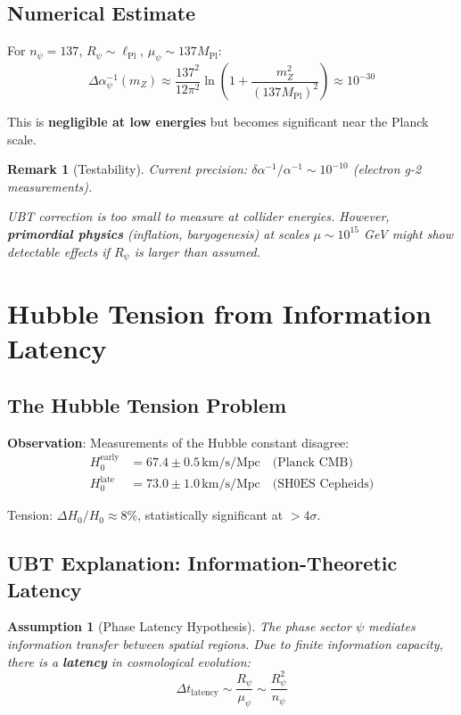 \documentclass[12pt]{article}
\newtheorem{remark}[definition]{Remark}
\newtheorem{assumption}{Assumption}[section]
\begin{document}
\subsection{Numerical Estimate}

For $n_\psi = 137$, $R_\psi \sim \ell_{\text{Pl}}$, $\mu_\psi \sim 137 M_{\text{Pl}}$:
\begin{equation}
\Delta \alpha^{-1}_{\psi}(m_Z) \approx \frac{137^2}{12\pi^2} \ln\left(1 + \frac{m_Z^2}{(137 M_{\text{Pl}})^2}\right) \approx 10^{-30}
\end{equation}

This is \textbf{negligible at low energies} but becomes significant near the Planck scale.

\begin{remark}[Testability]
Current precision: $\delta \alpha^{-1} / \alpha^{-1} \sim 10^{-10}$ (electron g-2 measurements).

UBT correction is too small to measure at collider energies. However, \textbf{primordial physics} (inflation, baryogenesis) at scales $\mu \sim 10^{15}$ GeV might show detectable effects if $R_\psi$ is larger than assumed.
\end{remark}

\section{Hubble Tension from Information Latency}
\label{sec:hubble_tension}

\subsection{The Hubble Tension Problem}

\textbf{Observation}: Measurements of the Hubble constant disagree:
\begin{align}
H_0^{\text{early}} &= 67.4 \pm 0.5 \, \text{km/s/Mpc} \quad \text{(Planck CMB)} \\
H_0^{\text{late}} &= 73.0 \pm 1.0 \, \text{km/s/Mpc} \quad \text{(SH0ES Cepheids)}
\end{align}

Tension: $\Delta H_0 / H_0 \approx 8\%$, statistically significant at $>4\sigma$.

\subsection{UBT Explanation: Information-Theoretic Latency}

\begin{assumption}[Phase Latency Hypothesis]
\label{ass:latency}
The phase sector $\psi$ mediates information transfer between spatial regions. Due to finite information capacity, there is a \textbf{latency} in cosmological evolution:
\begin{equation}
\Delta t_{\text{latency}} \sim \frac{R_\psi}{\mu_\psi} \sim \frac{R_\psi^2}{n_\psi}
\end{equation}
\end{assumption}
\end{document}
